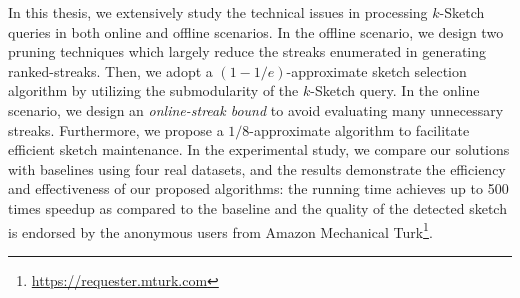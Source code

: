 %

In this thesis, we extensively study
the technical issues in processing $k$-Sketch queries in both online and offline scenarios.
In the offline scenario, we design two pruning techniques which largely
reduce the streaks enumerated in generating ranked-streaks. Then, we adopt a
$(1-1/e)$-approximate sketch selection algorithm by utilizing the 
submodularity of the $k$-Sketch query. In the online scenario, we design
an \emph{online-streak bound} to avoid evaluating many unnecessary streaks. Furthermore,
we propose a $1/8$-approximate algorithm to facilitate efficient sketch maintenance.
In the experimental study, we compare our solutions with baselines using
four real datasets, and the results demonstrate the efficiency and 
effectiveness of our proposed algorithms: the running time
achieves up to 500 times speedup as compared to the baseline and the quality of the
detected sketch is endorsed by the anonymous users
from Amazon Mechanical Turk\footnote{\url{https://requester.mturk.com}}. 
%


